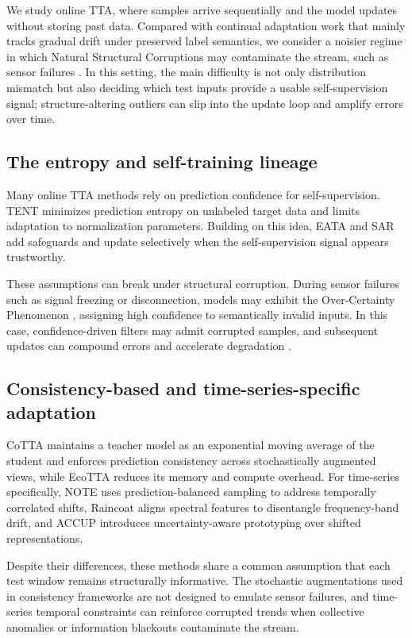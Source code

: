 \documentclass[sigconf, screen, review, anonymous]{acmart}
\theoremstyle{plain}
\theoremstyle{definition}
\theoremstyle{remark}
\begin{document}
We study online TTA, where samples arrive sequentially and the model updates without storing past data. Compared with continual adaptation work that mainly tracks gradual drift under preserved label semantics, we consider a noisier regime in which Natural Structural Corruptions may contaminate the stream, such as sensor failures \citep{sunesh2026modeling}. In this setting, the main difficulty is not only distribution mismatch but also deciding which test inputs provide a usable self-supervision signal; structure-altering outliers can slip into the update loop and amplify errors over time.


\subsection{The entropy and self-training lineage}
Many online TTA methods rely on prediction confidence for self-supervision. TENT \citep{wang2021tent} minimizes prediction entropy on unlabeled target data and limits adaptation to normalization parameters. Building on this idea, EATA \citep{niu2022eata} and SAR \citep{niu2023sar} add safeguards and update selectively when the self-supervision signal appears trustworthy.

These assumptions can break under structural corruption. During sensor failures such as signal freezing or disconnection, models may exhibit the Over-Certainty Phenomenon \citep{amin2025overcertaintyphenomenonmoderntesttime}, assigning high confidence to semantically invalid inputs. In this case, confidence-driven filters may admit corrupted samples, and subsequent updates can compound errors and accelerate degradation \citep{gong2023sotta}.

\subsection{Consistency-based and time-series-specific adaptation}
CoTTA \citep{wang2022cotta} maintains a teacher model as an exponential moving average of the student and enforces prediction consistency across stochastically augmented views, while EcoTTA \citep{song2023ecotta} reduces its memory and compute overhead. For time-series specifically, NOTE \citep{gong2022note} uses prediction-balanced sampling to address temporally correlated shifts, Raincoat \citep{he2023domain} aligns spectral features to disentangle frequency-band drift, and ACCUP \citep{gong2025accup} introduces uncertainty-aware prototyping over shifted representations.

Despite their differences, these methods share a common assumption that each test window remains structurally informative. The stochastic augmentations used in consistency frameworks are not designed to emulate sensor failures, and time-series temporal constraints can reinforce corrupted trends when collective anomalies \citep{lai2021revisiting} or information blackouts \citep{sunesh2026modeling} contaminate the stream.
\end{document}
